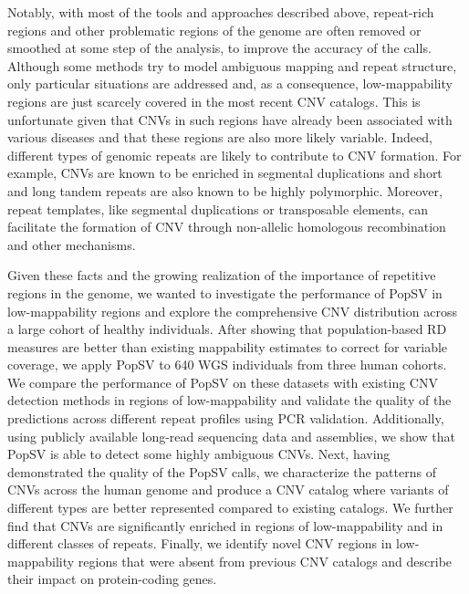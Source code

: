 Notably, with most of the tools and approaches described above, repeat-rich regions and other problematic regions of the genome are often removed or smoothed at some step of the analysis, to improve the accuracy of the calls. Although some methods\cite{Hormozdiari2010,He2011} try to model ambiguous mapping and repeat structure, only particular situations are addressed and, as a consequence, low-mappability regions are just scarcely covered in the most recent CNV catalogs\cite{Sudmant2015a}. This is unfortunate given that CNVs in such regions have already been associated with various diseases\cite{Ayarpadikannan2014,MacDonald1993,Rich2014,Mirkin2007,Carvalho2016} and that these regions are also more likely variable.
Indeed, different types of genomic repeats are likely to contribute to CNV formation.
For example, CNVs are known to be enriched in segmental duplications\cite{Sharp2006} and short and long tandem repeats are also known to be highly polymorphic\cite{Gymrek2012,Warburton2008}. Moreover, repeat templates, like segmental duplications or transposable elements, can facilitate the formation of CNV through non-allelic homologous recombination and other mechanisms\cite{Korbel2007}.

Given these facts and the growing realization of the importance of repetitive regions in the genome\cite{Hannan2018,Kazazian2017}, we wanted to investigate the performance of {\sf PopSV} in low-mappability regions and explore the comprehensive CNV distribution across a large cohort of healthy individuals.
After showing that population-based RD measures are better than existing mappability estimates to correct for variable coverage, we apply {\sf PopSV} to 640 WGS individuals from three human cohorts.
We compare the performance of {\sf PopSV} on these datasets with existing CNV detection methods in regions of low-mappability and validate the quality of the predictions across different repeat profiles using PCR validation.
Additionally, using publicly available long-read sequencing data and assemblies, we show that {\sf PopSV} is able to detect some highly ambiguous CNVs.
Next, having demonstrated the quality of the {\sf PopSV} calls, we characterize the patterns of CNVs across the human genome and produce a CNV catalog where variants of different types are better represented compared to existing catalogs.
We further find that CNVs are significantly enriched in regions of low-mappability and in different classes of repeats.
Finally, we identify novel CNV regions in low-mappability regions that were absent from previous CNV catalogs and describe their impact on protein-coding genes.

